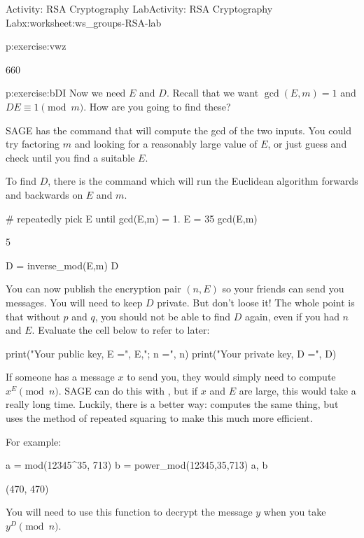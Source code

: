 \documentclass[11pt]{book}
\begin{document}
\begin{worksheet-section}{Activity: RSA Cryptography Lab}{}{Activity: RSA Cryptography Lab}{}{}{x:worksheet:ws_groups-RSA-lab}
\begin{divisionexercise}{2}{}{}{p:exercise:vwz}
\begin{sageoutput}
660
\end{sageoutput}
\end{divisionexercise}%
\begin{divisionexercise}{3}{}{}{p:exercise:bDI}%
Now we need \(E\) and \(D\).  Recall that we want \(\gcd(E,m) = 1\) and \(DE \equiv 1 \pmod{m}\).  How are you going to find these?%
\par
SAGE has the command that will compute the gcd of the two inputs.  You could try factoring \(m\) and looking for a reasonably large value of \(E\), or just guess and check until you find a suitable \(E\).%
\par
To find \(D\), there is the command which will run the Euclidean algorithm forwards and backwards on \(E\) and \(m\).%
\begin{sageinput}
# repeatedly pick E until gcd(E,m) = 1.
E = 35
gcd(E,m)
\end{sageinput}
\begin{sageoutput}
5
\end{sageoutput}
\begin{sageinput}
D = inverse_mod(E,m)
D
\end{sageinput}
\end{divisionexercise}%
You can now publish the encryption pair \((n,E)\) so your friends can send you messages.  You will need to keep \(D\) private.  But don't loose it!  The whole point is that without \(p\) and \(q\), you should not be able to find \(D\) again, even if you had \(n\) and \(E\).  Evaluate the cell below to refer to later:%
\begin{sageinput}
print("Your public key, E =", E,"; n =", n)
print("Your private key, D =", D)
\end{sageinput}
If someone has a message \(x\) to send you, they would simply need to compute \(x^E \pmod{n}\).  SAGE can do this with , but if \(x\) and \(E\) are large, this would take a really long time. Luckily, there is a better way: computes the same thing, but uses the method of repeated squaring to make this much more efficient.%
\par
For example:%
\begin{sageinput}
a = mod(12345^35, 713)
b = power_mod(12345,35,713)
a, b
\end{sageinput}
\begin{sageoutput}
(470, 470)
\end{sageoutput}
You will need to use this function to decrypt the message \(y\) when you take \(y^D \pmod{n}\).%

\end{worksheet-section}
\end{document}
